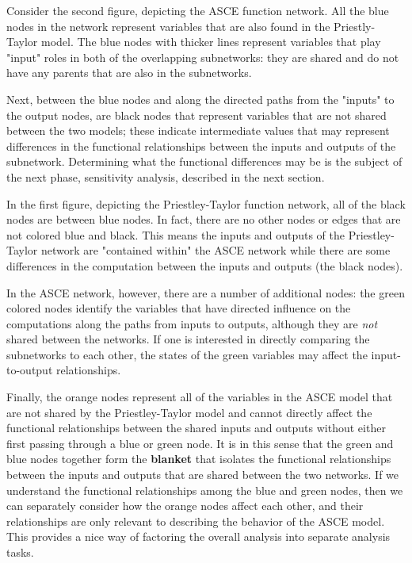 \documentclass[article, 12pt, oneside]{memoir}
\begin{document}
Consider the second figure, depicting the ASCE function network. All the
blue nodes in the network represent variables that are also found in the
Priestly-Taylor model. The blue nodes with thicker lines represent
variables that play "input" roles in both of the overlapping
subnetworks: they are shared and do not have any parents that are also
in the subnetworks.

Next, between the blue nodes and along the directed paths from the
"inputs" to the output nodes, are black nodes that represent variables
that are not shared between the two models; these indicate intermediate
values that may represent differences in the functional relationships
between the inputs and outputs of the subnetwork. Determining what the
functional differences may be is the subject of the next phase,
sensitivity analysis, described in the next section.

In the first figure, depicting the Priestley-Taylor function network,
all of the black nodes are between blue nodes. In fact, there are no
other nodes or edges that are not colored blue and black. This means the
inputs and outputs of the Priestley-Taylor network are "contained
within" the ASCE network while there are some differences in the
computation between the inputs and outputs (the black nodes).

In the ASCE network, however, there are a number of additional nodes:
the green colored nodes identify the variables that have directed
influence on the computations along the paths from inputs to outputs,
although they are \emph{not} shared between the networks. If one is
interested in directly comparing the subnetworks to each other, the
states of the green variables may affect the input-to-output
relationships.

Finally, the orange nodes represent all of the variables in the ASCE
model that are not shared by the Priestley-Taylor model and cannot
directly affect the functional relationships between the shared inputs
and outputs without either first passing through a blue or green node.
It is in this sense that the green and blue nodes together form the
\textbf{blanket} that isolates the functional relationships between the
inputs and outputs that are shared between the two networks. If we
understand the functional relationships among the blue and green nodes,
then we can separately consider how the orange nodes affect each other,
and their relationships are only relevant to describing the behavior of
the ASCE model. This provides a nice way of factoring the overall
analysis into separate analysis tasks.
\end{document}
